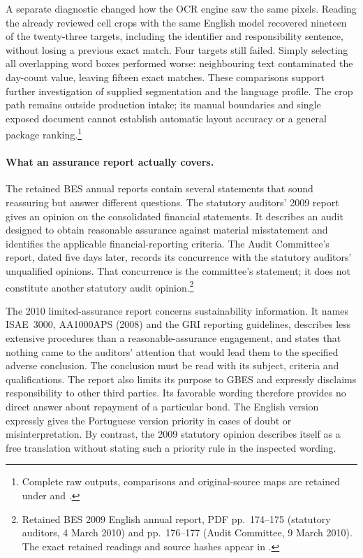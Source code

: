 A separate diagnostic changed how the OCR engine saw the same pixels.  Reading
the already reviewed cell crops with the same English model recovered nineteen
of the twenty-three targets, including the identifier and responsibility
sentence, without losing a previous exact match.  Four targets still failed.
Simply selecting all overlapping word boxes performed worse: neighbouring text
contaminated the day-count value, leaving fifteen exact matches.  These
comparisons support further investigation of supplied segmentation and the
language profile.  The crop path remains outside production intake; its manual
boundaries and single exposed document cannot establish automatic layout
accuracy or a general package ranking.\footnote{Complete raw outputs,
comparisons and original-source maps are retained under
 and
.}

\paragraph{What an assurance report actually covers.}
The retained BES annual reports contain several statements that sound reassuring
but answer different questions.  The statutory auditors' 2009 report gives an
opinion on the consolidated financial statements.  It describes an audit
designed to obtain reasonable assurance against material misstatement and
identifies the applicable financial-reporting criteria.  The Audit Committee's
report, dated five days later, records its concurrence with the statutory
auditors' unqualified opinions.  That concurrence is the committee's statement;
it does not constitute another statutory audit opinion.\footnote{Retained BES
2009 English annual report, PDF pp.~174--175 (statutory auditors, 4 March 2010)
and pp.~176--177 (Audit Committee, 9 March 2010).  The exact retained readings
and source hashes appear in
.}

The 2010 limited-assurance report concerns sustainability information.  It
names ISAE~3000, AA1000APS (2008) and the GRI reporting guidelines, describes
less extensive procedures than a reasonable-assurance engagement, and states
that nothing came to the auditors' attention that would lead them to the
specified adverse conclusion.  The conclusion must be read with its subject,
criteria and qualifications.  The report also limits its purpose to GBES and
expressly disclaims responsibility to other third parties.  Its favorable
wording therefore provides no direct answer about repayment of a particular
bond.  The English version expressly gives the Portuguese version priority
in cases of doubt or misinterpretation.  By contrast, the 2009 statutory
opinion describes itself as a free translation without stating such a priority
rule in the inspected wording.

